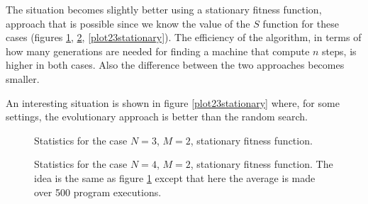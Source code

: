 \documentclass{report}
\begin{document}
The situation becomes slightly better using a stationary fitness function, approach that is possible since we know the value of the $S$ function for these cases (figures \ref{plot32stationary}, \ref{plot42stationary}, \ref{plot23stationary}). The efficiency of the algorithm, in terms of how many generations are needed for finding a machine that compute $n$ steps, is higher in both cases. Also the difference between the two approaches becomes smaller.

An interesting situation is shown in figure \ref{plot23stationary} where, for some settings, the evolutionary approach is better than the random search.

\begin{figure}[h]
\centering
{}
\caption[]{Statistics for the case $N=3$, $M=2$, stationary fitness function.}
\label{plot32stationary}
\end{figure}


\begin{figure}[h]
\centering
{}
\caption[]{Statistics for the case $N=4$, $M=2$, stationary fitness function. The idea is the same as figure \ref{plot32stationary} except that here the average is made over 500 program executions.}
\label{plot42stationary}
\end{figure}
\end{document}
